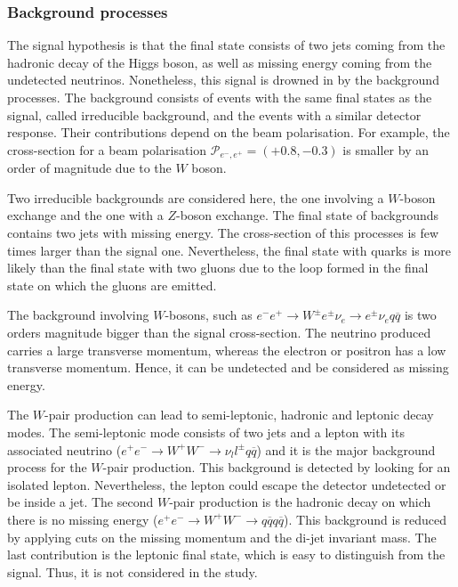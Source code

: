  \subsubsection{Background processes}

    The signal hypothesis is that the final state consists of two jets coming from the hadronic decay of the Higgs boson, as well as missing energy coming from the undetected neutrinos. 
    Nonetheless, this signal is drowned in by the background processes.
    The background consists of events with the same final states as the signal, called irreducible background, and the events with a similar detector response.
    Their contributions depend on the beam polarisation.
    For example, the cross-section for a beam polarisation $\mathcal{P}_{e^-,e^+} = (+0.8,-0.3)$ is smaller by an order of magnitude due to the $W$ boson.

    Two irreducible backgrounds are considered here, the one involving a $W$-boson exchange and the one with a $Z$-boson exchange.
    The final state of backgrounds contains two jets with missing energy.
    The cross-section of this processes is few times larger than the signal one.
    Nevertheless, the final state with quarks is more likely than the final state with two gluons due to the loop formed in the final state on which the gluons are emitted.

    The background involving $W$-bosons, such as $e^{-}e^{+} \rightarrow W^{\pm}e^{\pm}\nu_{e} \rightarrow e^{\pm}\nu_{e}q\overline{q}$ is two orders magnitude bigger than the signal cross-section.
    The neutrino produced carries a large transverse momentum, whereas the electron or positron has a low transverse momentum.
    Hence, it can be undetected and be considered as missing energy.
    
    The $W$-pair production can lead to semi-leptonic, hadronic and leptonic decay modes.
    The semi-leptonic mode consists of two jets and a lepton with its associated neutrino ($e^{+}e^{-} \rightarrow W^+W^- \rightarrow \nu_{l}l^{\pm}q\overline{q}$) and it is the major background process for the $W$-pair production.
    This background is detected by looking for an isolated lepton.
    Nevertheless, the lepton could escape the detector undetected or be inside a jet.
    The second $W$-pair production is the hadronic decay on which there is no missing energy ($e^{+}e^{-} \rightarrow W^+W^- \rightarrow q\overline{q} q\overline{q}$).
    This background is reduced by applying cuts on the missing momentum and the di-jet invariant mass.
    The last contribution is the leptonic final state, which is easy to distinguish from the signal.
    Thus, it is not considered in the study. 

